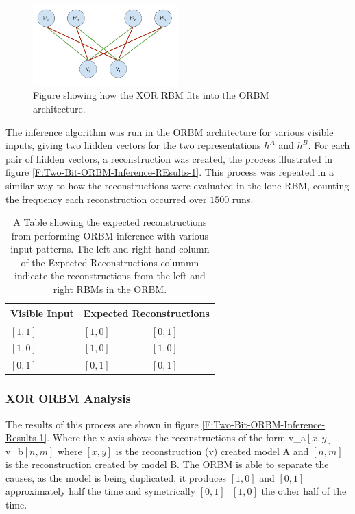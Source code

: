 \begin{figure}
  \begin{center}
    \includegraphics[width=0.5\textwidth]{Assets/XOR-ORBM.png}
  \end{center}
  \caption{Figure showing how the XOR RBM fits into the ORBM architecture.}
  \label{F:XOR-ORBM}
\end{figure}

The inference algorithm was run in the ORBM architecture for various visible inputs, giving two hidden vectors for the two representations $h^A$ and $h^B$. For each pair of hidden vectors, a reconstruction was created, the process illustrated in figure \ref{F:Two-Bit-ORBM-Inference-REsults-1}. This process was repeated in a similar way to how the reconstructions were evaluated in the lone RBM, counting the frequency each reconstruction occurred over $1500$ runs.

\begin{table}[]
\centering
\begin{tabular}{|l|l|l|}
\hline
Visible Input & \multicolumn{2}{l|}{Expected Reconstructions} \\ \hline
$[1 , 1 ]$    & $[1, 0]$              & $[0,1]$               \\ \hline
$[1, 0 ]$     & $[1,0]$               & $[1, 0]$              \\ \hline
$[0, 1]$      & $[0,1]$               & $[0,1]$               \\ \hline
\end{tabular}
\caption{A Table showing the expected reconstructions from performing ORBM inference with various input patterns. The left and right hand column of the Expected Reconstructions colummn indicate the reconstructions from the left and right RBMs in the ORBM.}
\label{my-label}
\end{table}

\subsubsection{XOR ORBM Analysis}

The results of this process are shown in figure \ref{F:Two-Bit-ORBM-Inference-Results-1}. Where the x-axis shows the reconstructions of the form v\_a$[x,y]$ v\_b$[n,m]$ where $[x,y]$ is the reconstruction (v) created model A and $[n,m]$ is the reconstruction created by model B. The ORBM is able to separate the causes, as the model is being duplicated, it produces $[1,0]$ and $[0,1]$ approximately half the time and symetrically $[0,1]\text{ }[1,0]$ the other half of the time.

